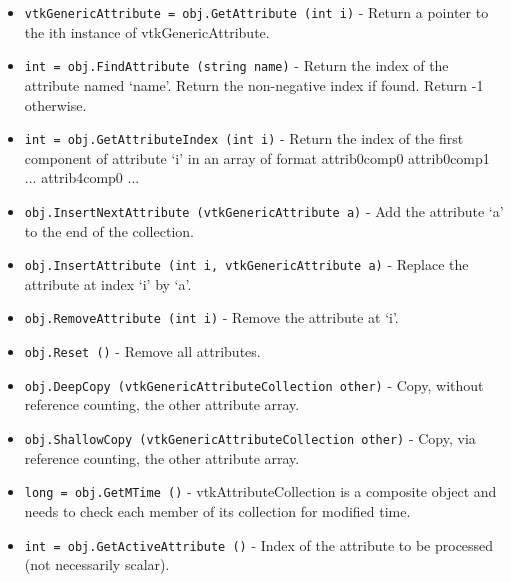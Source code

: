 \begin{itemize}
\item  \verb|vtkGenericAttribute = obj.GetAttribute (int i)| -  Return a pointer to the ith instance of vtkGenericAttribute.
 
 
 

\item  \verb|int = obj.FindAttribute (string name)| -  Return the index of the attribute named `name'. Return the non-negative
 index if found. Return -1 otherwise.
 
 

\item  \verb|int = obj.GetAttributeIndex (int i)| -  Return the index of the first component of attribute `i' in an array of
 format attrib0comp0 attrib0comp1 ... attrib4comp0 ...
 
 

\item  \verb|obj.InsertNextAttribute (vtkGenericAttribute a)| -  Add the attribute `a' to the end of the collection.
 
 
 

\item  \verb|obj.InsertAttribute (int i, vtkGenericAttribute a)| -  Replace the attribute at index `i' by `a'.
 
 
 
 
 

\item  \verb|obj.RemoveAttribute (int i)| -  Remove the attribute at `i'.
 
 
 

\item  \verb|obj.Reset ()| -  Remove all attributes.
 

\item  \verb|obj.DeepCopy (vtkGenericAttributeCollection other)| -  Copy, without reference counting, the other attribute array.
 
 
 

\item  \verb|obj.ShallowCopy (vtkGenericAttributeCollection other)| -  Copy, via reference counting, the other attribute array.
 
 
 

\item  \verb|long = obj.GetMTime ()| -  vtkAttributeCollection is a composite object and needs to check each
 member of its collection for modified time.

\item  \verb|int = obj.GetActiveAttribute ()| -  Index of the attribute to be processed (not necessarily scalar).
 

\end{itemize}
